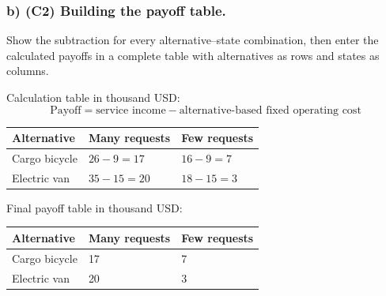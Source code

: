 \subsubsection*{b) \textbf{(C2)} Building the payoff table.}
\label{subsec:problem9-library-delivery-service-c2}
Show the subtraction for every alternative--state combination, then enter the calculated payoffs in a complete table with alternatives as rows and states as columns.

Calculation table in thousand USD:
\[
\text{Payoff}=\text{service income}-\text{alternative-based fixed operating cost}
\]
\begin{center}
\small
\begin{tabular}{lll}
\toprule
Alternative & Many requests & Few requests \\
\midrule
Cargo bicycle & $26 - 9 = 17$ & $16 - 9 = 7$ \\
Electric van & $35 - 15 = 20$ & $18 - 15 = 3$ \\
\bottomrule
\end{tabular}
\end{center}

Final payoff table in thousand USD:
\begin{center}
\begin{tabular}{lll}
\toprule
Alternative & Many requests & Few requests \\
\midrule
Cargo bicycle & 17 & 7 \\
Electric van & 20 & 3 \\
\bottomrule
\end{tabular}
\end{center}
